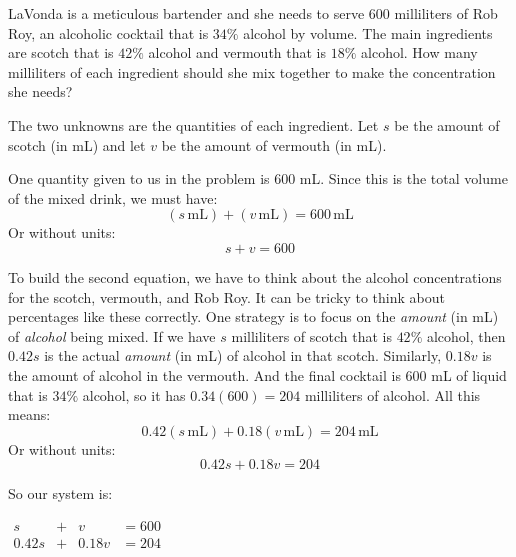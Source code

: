 \documentclass[nooutcomes]{ximera}
\begin{document}
 \begin{example}
          LaVonda is a meticulous bartender and she needs to serve $600$ milliliters of Rob Roy,
          an alcoholic cocktail that is $34\%$ alcohol by volume.
          The main ingredients are scotch that is $42\%$ alcohol and vermouth that is $18\%$ alcohol.
          How many milliliters of each ingredient should she mix together to make the concentration she needs?
\begin{explanation}
          The two unknowns are the quantities of each ingredient.
          Let $s$ be the amount of scotch (in
         mL) and let $v$ be the amount of vermouth
          (in
        mL).
    


          One quantity given to us in the problem is     $600$ mL.
          Since this is the total volume of the mixed drink, we must have:
          $$
            (s\,\text{mL})+(v\,\text{mL})=600\,\text{mL}
        $$
          Or without units:
         $$
            s+v=600
        $$
      
          To build the second equation,
          we have to think about the alcohol concentrations for the scotch,
          vermouth,
          and Rob Roy.
          It can be tricky to think about percentages like these correctly.
          One strategy is to focus on the \textit{amount} (in
        mL) of \textit{alcohol} being mixed.
          If we have $s$ milliliters of scotch that is $42\%$ alcohol,
          then $0.42s$ is the actual \textit{amount} (in
       mL) of alcohol in that scotch.
          Similarly, $0.18v$ is the amount of alcohol in the vermouth.
          And the final cocktail is
          $600$ mL
          of liquid that is $34\%$ alcohol,
          so it has $0.34(600)=204$ milliliters of alcohol.
          All this means:
          $$
            0.42(s\,\text{mL})+0.18(v\,\text{mL})=204\,\text{mL}
          $$
          Or without units:
       $$
            0.42s+0.18v=204
         $$

      
          So our system is:
\begin{center}
$
            \begin{array}{cccc}
            s&+& v&=600 \\
            0.42s&+&0.18v&=204
            \end{array}
      $
\end{center}


\end{explanation}
\end{example}
\end{document}
